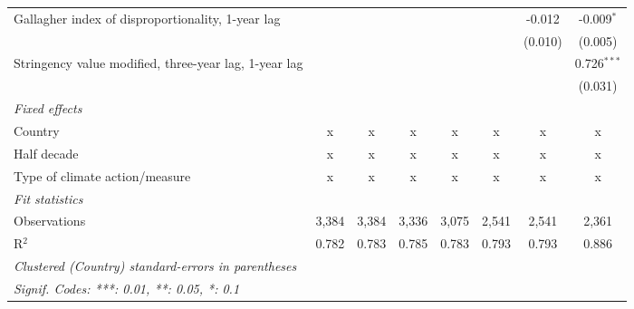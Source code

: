 \begin{table}[htbp]
\begin{tabular}{lccccccc}
      Gallagher index of disproportionality, 1-year lag     &         &         &             &             &               & -0.012        & -0.009$^{*}$\\   
                                                            &         &         &             &             &               & (0.010)       & (0.005)\\   
      Stringency value modified, three-year lag, 1-year lag &         &         &             &             &               &               & 0.726$^{***}$\\   
                                                            &         &         &             &             &               &               & (0.031)\\   
      \emph{Fixed effects}\\
      Country                                               & x       & x       & x           & x           & x             & x             & x\\  
      Half decade                                           & x       & x       & x           & x           & x             & x             & x\\  
      Type of climate action/measure                        & x       & x       & x           & x           & x             & x             & x\\  
      \midrule \emph{Fit statistics}\\
      Observations                                          & 3,384   & 3,384   & 3,336       & 3,075       & 2,541         & 2,541         & 2,361\\  
      R$^2$                                                 & 0.782   & 0.783   & 0.785       & 0.783       & 0.793         & 0.793         & 0.886\\  
      \midrule
      \multicolumn{8}{l}{\emph{Clustered (Country) standard-errors in parentheses}}\\
      \multicolumn{8}{l}{\emph{Signif. Codes: ***: 0.01, **: 0.05, *: 0.1}}\\
   \end{tabular}
\end{table}


